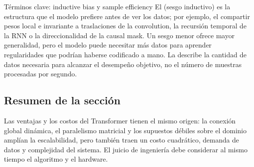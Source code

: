 \begin{knowledgebox}{Términos clave: inductive bias y sample efficiency}
El  (sesgo inductivo) es la estructura que el modelo prefiere antes de ver los datos; por ejemplo, el compartir pesos local e invariante a traslaciones de la convolution, la recursión temporal de la RNN o la direccionalidad de la causal mask. Un sesgo menor ofrece mayor generalidad, pero el modelo puede necesitar más datos para aprender regularidades que podrían haberse codificado a mano. La  describe la cantidad de datos necesaria para alcanzar el desempeño objetivo, no el número de muestras procesadas por segundo.
\end{knowledgebox}

\subsection{Resumen de la sección}

Las ventajas y los costos del Transformer tienen el mismo origen: la conexión global dinámica, el paralelismo matricial y los supuestos débiles sobre el dominio amplían la escalabilidad, pero también traen un costo cuadrático, demanda de datos y complejidad del sistema. El juicio de ingeniería debe considerar al mismo tiempo el algoritmo y el hardware.
